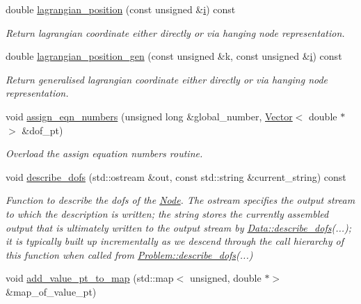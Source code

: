 \begin{DoxyCompactItemize}
double \hyperlink{classoomph_1_1SolidNode_a790277999eb7d8ff0c3f2398d8aaedb0}{lagrangian\+\_\+position} (const unsigned \&\hyperlink{cfortran_8h_adb50e893b86b3e55e751a42eab3cba82}{i}) const
\begin{DoxyCompactList}\small\item\em Return lagrangian coordinate either directly or via hanging node representation. \end{DoxyCompactList}\item 
double \hyperlink{classoomph_1_1SolidNode_a7d001ac17bfbfdb96209d723577dd598}{lagrangian\+\_\+position\+\_\+gen} (const unsigned \&k, const unsigned \&\hyperlink{cfortran_8h_adb50e893b86b3e55e751a42eab3cba82}{i}) const
\begin{DoxyCompactList}\small\item\em Return generalised lagrangian coordinate either directly or via hanging node representation. \end{DoxyCompactList}\item 
void \hyperlink{classoomph_1_1SolidNode_aae4b4c238455ded700e5aac8b058e27d}{assign\+\_\+eqn\+\_\+numbers} (unsigned long \&global\+\_\+number, \hyperlink{classoomph_1_1Vector}{Vector}$<$ double $\ast$$>$ \&dof\+\_\+pt)
\begin{DoxyCompactList}\small\item\em Overload the assign equation numbers routine. \end{DoxyCompactList}\item 
void \hyperlink{classoomph_1_1SolidNode_a93ba15b4ab3ccd1d0030179878df4330}{describe\+\_\+dofs} (std\+::ostream \&out, const std\+::string \&current\+\_\+string) const
\begin{DoxyCompactList}\small\item\em Function to describe the dofs of the \hyperlink{classoomph_1_1Node}{Node}. The ostream specifies the output stream to which the description is written; the string stores the currently assembled output that is ultimately written to the output stream by \hyperlink{classoomph_1_1Data_a2dae16e2dcff9a40029f834c83364df5}{Data\+::describe\+\_\+dofs}(...); it is typically built up incrementally as we descend through the call hierarchy of this function when called from \hyperlink{classoomph_1_1Problem_abc103804eb319ae0b3d43870cc3e1eaf}{Problem\+::describe\+\_\+dofs}(...) \end{DoxyCompactList}\item 
void \hyperlink{classoomph_1_1SolidNode_a0c4a46d5a85e2a6d063c127b3df07058}{add\+\_\+value\+\_\+pt\+\_\+to\+\_\+map} (std\+::map$<$ unsigned, double $\ast$$>$ \&map\+\_\+of\+\_\+value\+\_\+pt)

\end{DoxyCompactItemize}
